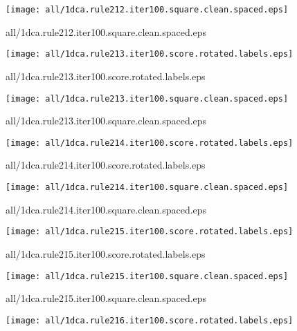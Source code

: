 \documentclass{article}
\begin{document}
\begin{center}
\begin{minipage}{\textwidth}
\texttt{[image: all/1dca.rule212.iter100.square.clean.spaced.eps]}
\end{minipage}
\end{center}
{\footnotesize all/1dca.rule212.iter100.square.clean.spaced.eps}
\begin{center}
\begin{minipage}{\textwidth}
\texttt{[image: all/1dca.rule213.iter100.score.rotated.labels.eps]}
\end{minipage}
\end{center}
{\footnotesize all/1dca.rule213.iter100.score.rotated.labels.eps}
\begin{center}
\begin{minipage}{\textwidth}
\texttt{[image: all/1dca.rule213.iter100.square.clean.spaced.eps]}
\end{minipage}
\end{center}
{\footnotesize all/1dca.rule213.iter100.square.clean.spaced.eps}
\begin{center}
\begin{minipage}{\textwidth}
\texttt{[image: all/1dca.rule214.iter100.score.rotated.labels.eps]}
\end{minipage}
\end{center}
{\footnotesize all/1dca.rule214.iter100.score.rotated.labels.eps}
\begin{center}
\begin{minipage}{\textwidth}
\texttt{[image: all/1dca.rule214.iter100.square.clean.spaced.eps]}
\end{minipage}
\end{center}
{\footnotesize all/1dca.rule214.iter100.square.clean.spaced.eps}
\begin{center}
\begin{minipage}{\textwidth}
\texttt{[image: all/1dca.rule215.iter100.score.rotated.labels.eps]}
\end{minipage}
\end{center}
{\footnotesize all/1dca.rule215.iter100.score.rotated.labels.eps}
\begin{center}
\begin{minipage}{\textwidth}
\texttt{[image: all/1dca.rule215.iter100.square.clean.spaced.eps]}
\end{minipage}
\end{center}
{\footnotesize all/1dca.rule215.iter100.square.clean.spaced.eps}
\begin{center}
\begin{minipage}{\textwidth}
\texttt{[image: all/1dca.rule216.iter100.score.rotated.labels.eps]}
\end{minipage}
\end{center}
\end{document}
